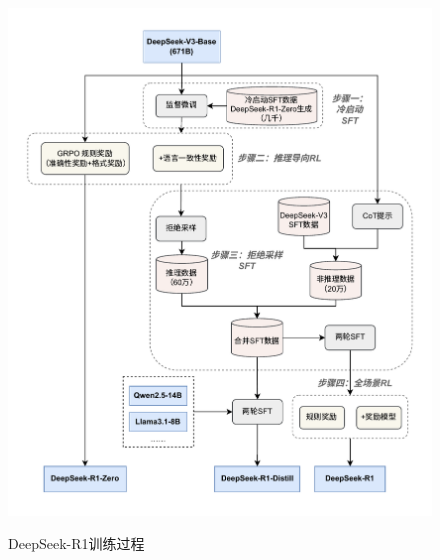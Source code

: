 \begin{figure}[ht]
    \centering
    \includegraphics[width=1\textwidth]
    {figures/deepseek_r1_training_v2.pdf}\\
    \caption{DeepSeek-R1训练过程}
    \label{fig:deepseek_r1_training_v2} %
\end{figure}

